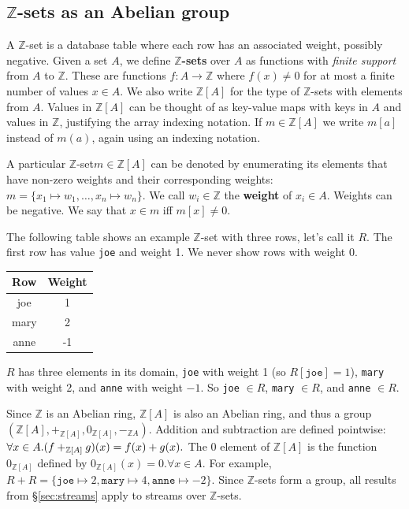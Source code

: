 \documentclass[twocolumn
]{svjour3}
\numberwithin{equation}{section}
\newcommand{\defined}[1]{\textbf{#1}\index{}}
\newcommand{\zr}{$\Z$-set\xspace}
\newcommand{\zrs}{$\Z$-sets\xspace} %
\newcommand{\Z}{\mathbb{Z}}  %
\newcommand{\secref}[1]{\S\ref{#1}}  %
\begin{document}
\vspace{-3ex}

\subsection{\zrs as an Abelian group}

A \zr is a database table where each row has an associated weight,
possibly negative.  Given a set $A$, we define \defined{\zrs} over $A$
as functions with \emph{finite support} from $A$ to $\Z$.  These are
functions $f: A \rightarrow \Z$ where $f(x) \not= 0$ for at most a
finite number of values $x \in A$.  We also write $\Z[A]$ for the type
of \zrs with elements from $A$.  Values in $\Z[A]$ can be thought of
as key-value maps with keys in $A$ and values in $\Z$, justifying the
array indexing notation.  If $m \in \Z[A]$ we write $m[a]$ instead of
$m(a)$, again using an indexing notation.

A particular \zr $m \in \Z[A]$ can be denoted by enumerating its
elements that have non-zero weights and their corresponding weights:
$m = \{ x_1 \mapsto w_1, \dots, x_n \mapsto w_n \}$.
We call $w_i \in \Z$ the \defined{weight}
of $x_i \in A$.  Weights can be negative.
We say that $x \in m$ iff $m[x] \not= 0$.

The following table shows an example \zr with three rows, let's call
it $R$.  The first row has value \texttt{joe} and weight 1.  We never
show rows with weight 0.
%
\begin{center}
\begin{tabular}{|c|c|}\hline
  Row & Weight \\ \hline
  joe & 1 \\
  mary & 2 \\
  anne & -1 \\ \hline
\end{tabular}
\end{center}

$R$ has three elements in its domain, \texttt{joe} with weight 1 (so
$R[\texttt{joe}] = 1$), \texttt{mary} with weight 2, and \texttt{anne}
with weight $-1$.  So \texttt{joe} $\in R$, \texttt{mary} $\in R$,
and \texttt{anne} $\in R$.

Since $\Z$ is an Abelian ring, $\Z[A]$ is also an Abelian ring, and
thus a group $(\Z[A], +_{\Z[A]}, 0_{\Z[A]}, -_{\Z{A}})$.  Addition and
subtraction are defined pointwise: $\forall x \in A . \\ (f +_{\Z[A]}
g)(x) = f(x) + g(x) .$ The $0$ element of $\Z[A]$ is the function
$0_{\Z[A]}$ defined by $0_{\Z[A]}(x) = 0 .  \forall x \in A$.  For
example, $R + R = \{ \texttt{joe} \mapsto 2, \texttt{mary} \mapsto 4,
\texttt{anne} \mapsto -2 \}$.  Since \zrs form a group, all results
from \secref{sec:streams} apply to streams over \zrs.
\end{document}
